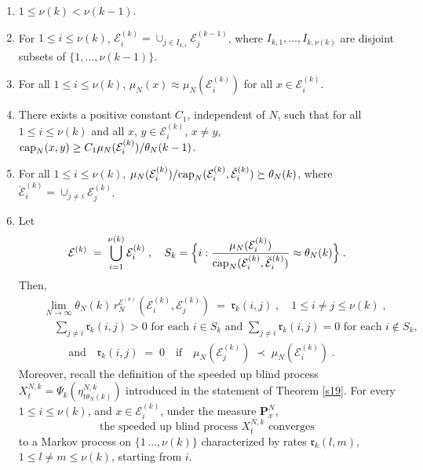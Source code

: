 \documentclass[reqno]{amsart}
\begin{document}
\begin{enumerate}
\item $1\le \nu(k)<\nu(k-1)$.

\item For $1\le i\le \nu(k)$, ${{\mathcal E}}^{(k)}_i = \cup_{j\in I_{k,i}}
  {{\mathcal E}}^{(k-1)}_j$, where $I_{k,1}, \dots, I_{k,\nu(k)}$ are disjoint
  subsets of $\{1, \dots, \nu(k-1)\}$. 

\item For all $1\le i\le \nu(k)$, $\mu_N(x) \approx \mu_N({{\mathcal E}}^{(k)}_i)$ for
  all $x\in {{\mathcal E}}^{(k)}_i$.

\item There exists a positive constant $C_1$, independent of $N$, such
  that for all $1\le i\le \nu(k)$ and all $x$, $y \in {{\mathcal E}}^{(k)}_i$,
  $x\not = y$, ${{\rm cap}}_N (x,y) \ge C_1 \mu_N({{\mathcal E}}^{(k)}_i)/\theta_N(k-1)$.

\item For all $1\le i\le \nu(k)$, $\mu_N({{\mathcal E}}^{(k)}_i)/{{\rm cap}}_N({{\mathcal E}}^{(k)}_i , \breve{{{\mathcal E}}}^{(k)}_i) \succeq \theta_N (k)$, where
  $\breve{{{\mathcal E}}}^{(k)}_i = \cup_{j\not = i} {{\mathcal E}}^{(k)}_j$.

\item Let 
\begin{equation*}
{{\mathcal E}}^{(k)} \;=\; \bigcup_{i=1}^{\nu(k)} {{\mathcal E}}^{(k)}_i \;,
\quad S_k = \Big\{ i : \frac{\mu_N({{\mathcal E}}^{(k)}_i)}{{{\rm cap}}_N({{\mathcal E}}^{(k)}_i ,
\breve{{{\mathcal E}}}^{(k)}_i)} \approx \theta_N (k) \Big\}\;.
\end{equation*}
Then,
\begin{equation}
\label{37}
\begin{split}
&\quad \lim_{N\to\infty} \theta_N(k) \, r^{{{\mathcal E}}^{(k)}}_N({{\mathcal E}}^{(k)}_i, {{\mathcal E}}^{(k)}_j) \;=\;  {{\mathfrak r}}_k(i,j)\;, \quad 1\le i\not =j \le \nu(k)\;, \\
& {}\qquad \sum_{j\not = i} {{\mathfrak r}}_k(i,j)>0 \text{ for each $i\in S_k$ and }
\sum_{j\not = i} {{\mathfrak r}}_k(i,j)=0 \text{ for each $i\not\in S_k$,} \\
&\qquad\quad \text{ and}\quad  {{\mathfrak r}}_k(i,j) \;=\; 0 
\quad \text{if}\quad \mu_N({{\mathcal E}}^{(k)}_j) \;\prec\;
\mu_N({{\mathcal E}}^{(k)}_i) \; .
\end{split}
\end{equation}
Moreover, recall the definition of the speeded up blind process
$X^{N,k}_t = \Psi_k(\eta^{N, k}_{t \theta_N (k)})$ introduced in the
statement of Theorem \ref{s19}. For every $1\le i\le \nu(k)$, and
$x\in {{\mathcal E}}^{(k)}_i$, under the measure ${{\mathbf P}}^N_x$,
\begin{equation}
\label{20}
\text{the speeded up blind process $X^{N,k}_{t}$ converges}
\end{equation}
to a Markov process on $\{1\, \dots, \nu(k)\}$ characterized by rates
${{\mathfrak r}}_k(l,m)$, $1\le l \not = m\le \nu(k)$, starting from
$i$. 


\end{enumerate}
\end{document}

